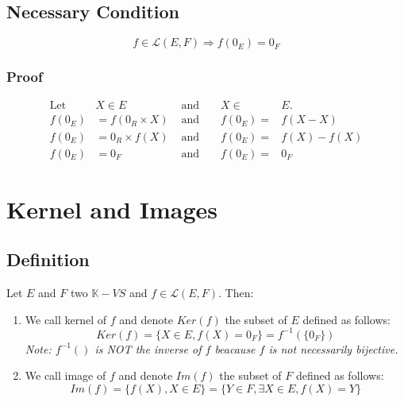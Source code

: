 \documentclass[notitlepage]{math}
\begin{document}
\subsection{Necessary Condition}
\[ f \in \mathcal{L}(E,F) \Longrightarrow f(0_E)=0_F\]
\subsubsection{Proof}
\begin{align*}
    \text{Let } &X \in E &\text{ and }  && X \in& E.\\
    f(0_E) &= f(0_R \times X)  &\text{ and } && f(0_E) =& f(X - X) \\
    f(0_E) &= 0_R \times f(X) &\text{ and } && f(0_E) =& f(X) - f(X) \\
    f(0_E) &= 0_F &\text{ and } && f(0_E) =& 0_F
\end{align*}
\section{Kernel and Images}
\subsection{Definition}
Let $E$ and $F$ two $\mathbb{K}-VS$ and $f \in \mathcal{L}(E,F)$. Then:

\begin{enumerate}
    \item We call kernel of $f$ and denote $Ker(f)$ the subset of $E$ defined as follows: 
    \[ Ker(f) = \{X \in E, f(X) = 0_F\} = f^{-1}(\{0_F\})\]
    \textit{Note: $f^{-1}()$ is NOT the inverse of $f$ beacause $f$ is not necessarily bijective.}
    \item We call image of $f$ and denote $Im(f)$ the subset of $F$ defined as follows:
    \[ Im(f) = \{f(X), X \in E\}=\{Y \in F, \exists X \in E, f(X) = Y\}\]
\end{enumerate}
\end{document}
